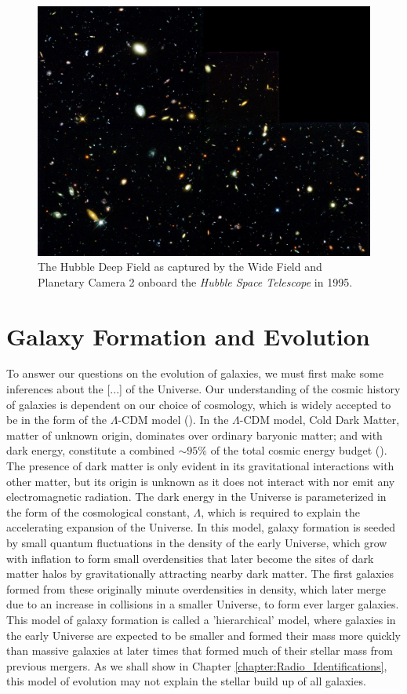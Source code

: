 \begin{figure}
    \centering
	\includegraphics[width=0.9\columnwidth]{Figures/hubble_deep_field.pdf}
	\caption{The Hubble Deep Field as captured by the Wide Field and Planetary Camera 2 onboard the \textit{Hubble Space Telescope} in 1995.}
	\label{fig:hubble_deep_field}
\end{figure}

\section{Galaxy Formation and Evolution}

To answer our questions on the evolution of galaxies, we must first make some inferences about the {\color{red}[...]} of the Universe. Our understanding of the cosmic history of galaxies is dependent on our choice of cosmology, which is widely accepted to be in the form of the $\Lambda$-CDM model (\citealt{Peebles_1980}). In the $\Lambda$-CDM model, Cold Dark Matter, matter of unknown origin, dominates over ordinary baryonic matter; and with dark energy, constitute a combined $\sim 95\%$ of the total cosmic energy budget (\citealt{Fukugita_2004}). The presence of dark matter is only evident in its gravitational interactions with other matter, but its origin is unknown as it does not interact with nor emit any electromagnetic radiation. The dark energy in the Universe is parameterized in the form of the cosmological constant, $\Lambda$, which is required to explain the accelerating expansion of the Universe. In this model, galaxy formation is seeded by small quantum fluctuations in the density of the early Universe, which grow with inflation to form small overdensities that later become the sites of dark matter halos by gravitationally attracting nearby dark matter. The first galaxies formed from these originally minute overdensities in density, which later merge due to an increase in collisions in a smaller Universe, to form ever larger galaxies. This model of galaxy formation is called a 'hierarchical' model, where galaxies in the early Universe are expected to be smaller and formed their mass more quickly than massive galaxies at later times that formed much of their stellar mass from previous mergers. As we shall show in Chapter \ref{chapter:Radio_Identifications}, this model of evolution may not explain the stellar build up of all galaxies.

